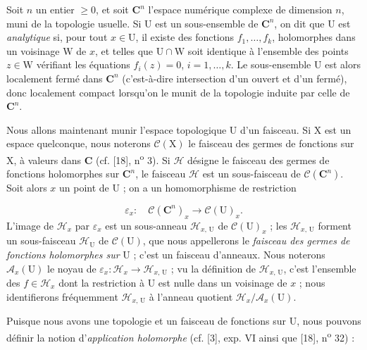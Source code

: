 Soit $n$ un entier $\geqslant 0$, et soit $\mathbf{C}^n$ l'espace numérique complexe de dimension $n$, muni de la topologie usuelle. Si $\mathrm{U}$ est un sous-ensemble de $\mathbf{C}^n$, on dit que $\mathrm{U}$ est \emph{analytique} si, pour tout $x \in \mathrm{U}$, il existe des fonctions $f_1, \ldots, f_k$, holomorphes dans un voisinage $\mathrm{W}$ de $x$, et telles que $\mathrm{U} \cap \mathrm{W}$ soit identique à l'ensemble des points $z \in \mathrm{W}$ vérifiant les équations $f_i(z) = 0$, $i = 1, \ldots, k$. Le sous-ensemble $\mathrm{U}$ est alors localement fermé dans $\mathbf{C}^n$ (c'est-à-dire intersection d'un ouvert et d'un fermé), donc localement compact lorsqu'on le munit de la topologie induite par celle de $\mathbf{C}^n$.

Nous allons maintenant munir l'espace topologique $\mathrm{U}$ d'un faisceau. Si $\mathrm{X}$ est un espace quelconque, nous noterons $\mathcal{C}(\mathrm{X})$ le faisceau des germes de fonctions sur $\mathrm{X}$, à valeurs dans $\mathbf{C}$ (cf. [18], n\textsuperscript{o} 3). Si $\mathcal{H}$ désigne le faisceau des germes de fonctions holomorphes sur $\mathbf{C}^n$, le faisceau $\mathcal{H}$ est un sous-faisceau de $\mathcal{C}(\mathbf{C}^n)$. Soit alors $x$ un point de $\mathrm{U}$ ; on a un homomorphisme de restriction

\begin{equation*}
\varepsilon_x : \quad \mathcal{C}(\mathbf{C}^n)_x \to \mathcal{C}(\mathrm{U})_x.
\end{equation*}
L'image de $\mathcal{H}_x$ par $\varepsilon_x$ est un sous-anneau $\mathcal{H}_{x,\,\mathrm{U}}$ de $\mathcal{C}(\mathrm{U})_x$ ; les $\mathcal{H}_{x,\,\mathrm{U}}$ forment un sous-faisceau $\mathcal{H}_{\mathrm{U}}$ de $\mathcal{C}(\mathrm{U})$, que nous appellerons le \emph{faisceau des germes de fonctions holomorphes sur} $\mathrm{U}$ ; c'est un faisceau d'anneaux. Nous noterons $\mathcal{A}_x(\mathrm{U})$ le noyau de $\varepsilon_x : \mathcal{H}_x \to \mathcal{H}_{x,\,\mathrm{U}}$ ; vu la définition de $\mathcal{H}_{x,\,\mathrm{U}}$, c'est l'ensemble des $f \in \mathcal{H}_x$ dont la restriction à $\mathrm{U}$ est nulle dans un voisinage de $x$ ; nous identifierons fréquemment $\mathcal{H}_{x,\,\mathrm{U}}$ à l'anneau quotient $\mathcal{H}_x / \mathcal{A}_x(\mathrm{U})$.

Puisque nous avons une topologie et un faisceau de fonctions sur $\mathrm{U}$, nous pouvons définir la notion d'\emph{application holomorphe} (cf. [3], exp. VI ainsi que [18], n\textsuperscript{o} 32) :

